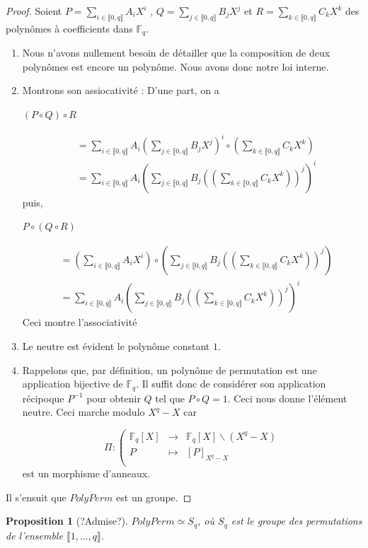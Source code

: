 \documentclass[12pt]{article}
\newcommand{\Fq}{\mathds{F}_q}
\newcommand{\fonction}[5]{
\begin{displaymath}
#1 :
\left(
\begin{array}{rcl}
#2 & \longrightarrow &#3 \\
#4 & \longmapsto & #5 \\
\end{array}
\right.
\end{displaymath}
}
\newtheorem{prop}{Proposition}
\theoremstyle{definition}
\begin{document}
\begin{proof}
Soient $ P = \displaystyle\sum_{i \in \llbracket 0, q \rrbracket} A_i X^i$ , $Q = \displaystyle\sum_{j \in \llbracket 0, q \rrbracket} B_j X^j$ et $R = \displaystyle\sum_{k \in \llbracket 0, q \rrbracket} C_k X^k$ des polynômes à coefficients dans $\Fq$. \newline
\break
	\begin{enumerate}[label=$\clubsuit$, font=\small  \color{blue}]
		\item Nous n'avons nullement besoin de détailler que la composition de deux polynômes est encore un polynôme. Nous avons donc notre loi interne.
		\item Montrons son assiocativité : \newline
D'une part, on a
			\begin{center} $\left( P\circ Q \right) \circ R$ \end{center}
			\begin{align*} 
&= \displaystyle\sum_{i \in \llbracket 0, q \rrbracket} A_i\left(\displaystyle\sum_{j \in \llbracket 0, q \rrbracket} B_j X^j\right)^i \circ \left(\displaystyle\sum_{k \in \llbracket 0, q \rrbracket} C_k X^k\right) \\ 
&= \displaystyle\sum_{i \in \llbracket 0, q \rrbracket} A_i\left(\displaystyle\sum_{j \in \llbracket 0, q \rrbracket} B_j \left(\left(\displaystyle\sum_{k \in \llbracket 0, q \rrbracket} C_k X^k\right)\right)^j\right)^i
			\end{align*} 
puis, 
			\begin{center} $P\circ \left(Q \circ R\right)$ \end{center}
			\begin{align*} 
&= \left(\displaystyle\sum_{i \in \llbracket 0, q \rrbracket} A_i X^i\right) \circ \left(\displaystyle\sum_{j \in \llbracket 0, q \rrbracket} B_j \left(\left(\displaystyle\sum_{k \in \llbracket 0, q \rrbracket} C_k X^k\right)\right)^j\right) \\
&=  \displaystyle\sum_{i \in \llbracket 0, q \rrbracket} A_i\left(\displaystyle\sum_{j \in \llbracket 0, q \rrbracket} B_j \left(\left(\displaystyle\sum_{k \in \llbracket 0, q \rrbracket} C_k X^k\right)\right)^j\right)^i
			\end{align*} 
Ceci montre l'associativité
	\item Le neutre est évident le polynôme constant $1$.
	\item Rappelons que, par définition, un polynôme de permutation est une application bijective de $\Fq$. Il suffit donc de considérer son application récipoque $P^{-1}$ pour obtenir $Q$ tel que $P\circ Q = 1$. Ceci nous donne l'élément neutre. Ceci marche modulo $X^q - X$ car
	\fonction{\Pi}{\Fq[X]}{\Fq[X] \backslash (X^q - X)}{P}{[P]_{X^q - X}} est un morphisme d'anneaux.
	\end{enumerate}	
Il s'ensuit que $PolyPerm$ est un groupe. 
\end{proof}

\begin{prop}[?Admise?]
 $PolyPerm \simeq S_q$, où $S_q$ est le groupe des permutations de l'ensemble $\llbracket 1, ... , q \rrbracket$.
\end{prop}
\end{document}
